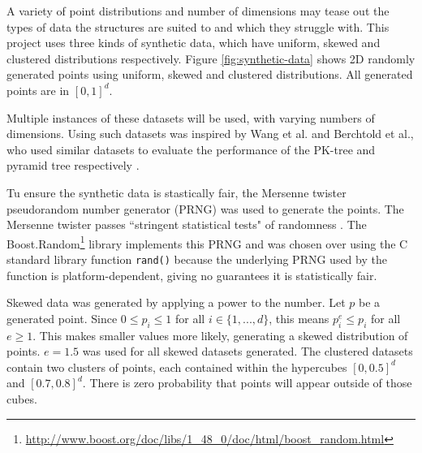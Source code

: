 A variety of point distributions and number of dimensions may tease out the types of data the structures are suited to and which they struggle with. This project uses three kinds of synthetic data, which have uniform, skewed and clustered distributions respectively. Figure \ref{fig:synthetic-data} shows 2D randomly generated points using uniform, skewed and clustered distributions. All generated points are in $[0,1]^d$.

Multiple instances of these datasets will be used, with varying numbers of dimensions. Using such datasets was inspired by Wang et al. and Berchtold et al., who used similar datasets to evaluate the performance of the PK-tree and pyramid tree respectively \cite{pk-tree, pyramid-tree}.

Tu ensure the synthetic data is stastically fair, the Mersenne twister pseudorandom number generator (PRNG) \cite{mersenne-twister} was used to generate the points.  The Mersenne twister passes ``stringent statistical tests" of randomness \cite{mersenne-twister}. The Boost.Random\footnote{\url{http://www.boost.org/doc/libs/1_48_0/doc/html/boost_random.html}} library implements this PRNG and was chosen over using the C standard library function \texttt{rand()} because the underlying PRNG used by the function is platform-dependent, giving no guarantees it is statistically fair.

Skewed data was generated by applying a power to the number. Let $p$ be a generated point. Since $0 \leq p_i \leq 1$ for all $i \in \lbrace 1, ..., d \rbrace$, this means $p_i^e \leq p_i$ for all $e \geq 1$. This makes smaller values more likely, generating a skewed distribution of points. $e = 1.5$ was used for all skewed datasets generated. The clustered datasets contain two clusters of points, each contained within the hypercubes $[0,0.5]^d$ and $[0.7,0.8]^d$. There is zero probability that points will appear outside of those cubes.

